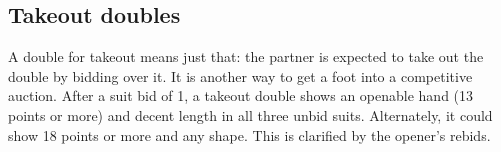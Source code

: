 \documentclass[11pt]{article}
\begin{document}
\subsection{Takeout doubles}

A double for takeout means just that: the partner is expected to
take out the double by bidding over it.  It is another way to get
a foot into a competitive auction.  After a suit bid of 1, a takeout
double shows an openable hand (13 points or more) and decent length
in all three unbid suits.  Alternately, it could show 18 points or more
and any shape.  This is clarified by the opener's rebids.
\end{document}
